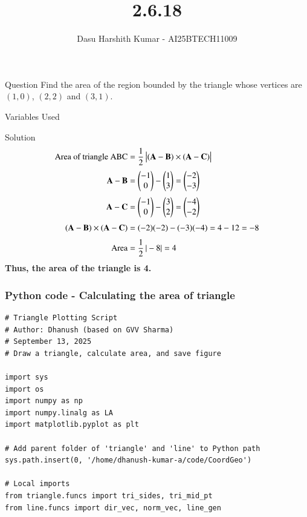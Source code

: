 \documentclass{beamer}
\title{2.6.18}
\author{Dasu Harshith Kumar  - AI25BTECH11009}
\begin{document}
\frame{\titlepage}

\begin{frame}{Question}
Find the area of the region bounded by the triangle whose vertices are $(1, 0)$, $(2, 2)$ and $(3, 1
)$.
\end{frame}

\begin{frame}{Variables Used}
\begin{table}[H]    
  \centering
  \caption{Variables Used}
  \label{tab:variables}
\end{table}
\end{frame}




\begin{frame}{Solution}
\begin{align}
\text{Area of triangle ABC} &= \frac{1}{2} \, \big| (\mathbf{A}-\mathbf{B}) \times (\mathbf{A}-\mathbf{C}) \big| \\[1mm]
\mathbf{A}-\mathbf{B} &= \begin{pmatrix}-1 \\ 0\end{pmatrix} - \begin{pmatrix}1 \\ 3\end{pmatrix} = \begin{pmatrix}-2 \\ -3\end{pmatrix} \\[1mm]
\mathbf{A}-\mathbf{C} &= \begin{pmatrix}-1 \\ 0\end{pmatrix} - \begin{pmatrix}3 \\ 2\end{pmatrix} = \begin{pmatrix}-4 \\ -2\end{pmatrix} \\[1mm]
(\mathbf{A}-\mathbf{B}) \times (\mathbf{A}-\mathbf{C}) &= (-2)(-2) - (-3)(-4) = 4 - 12 = -8 \\[1mm]
\text{Area} &= \frac{1}{2} \, | -8 | = 4
\end{align}
\noindent\textbf{Thus, the area of the triangle is 4.}
\end{frame}

\begin{frame}[fragile]                            
\frametitle{Python code - Calculating the area of triangle}                
\begin{lstlisting}
# Triangle Plotting Script
# Author: Dhanush (based on GVV Sharma)
# September 13, 2025
# Draw a triangle, calculate area, and save figure

import sys
import os
import numpy as np
import numpy.linalg as LA
import matplotlib.pyplot as plt

# Add parent folder of 'triangle' and 'line' to Python path
sys.path.insert(0, '/home/dhanush-kumar-a/code/CoordGeo')

# Local imports
from triangle.funcs import tri_sides, tri_mid_pt
from line.funcs import dir_vec, norm_vec, line_gen
\end{lstlisting}

\end{frame}
\end{document}
